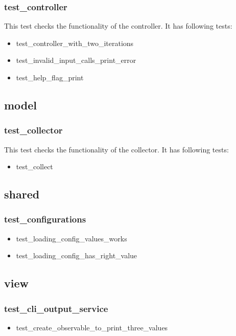 \documentclass[parskip=full]{scrartcl}
\begin{document}
\subsubsection{test_controller}
This test checks the functionality of the controller.
It has following tests:
\begin{itemize}
\item test_controller_with_two_iterations
\item test_invalid_input_calls_print_error
\item test_help_flag_print
\end{itemize}

\subsection{model}
\subsubsection{test_collector}
This test checks the functionality of the collector.
It has following tests:
\begin{itemize}
\item test_collect
\end{itemize}

\subsection{shared}
\subsubsection{test_configurations}
\begin{itemize}
\item test_loading_config_values_works
\item test_loading_config_has_right_value
\end{itemize}

\subsection{view}
\subsubsection{test_cli_output_service}
\begin{itemize}
\item test_create_observable_to_print_three_values
\end{itemize}
\end{document}
